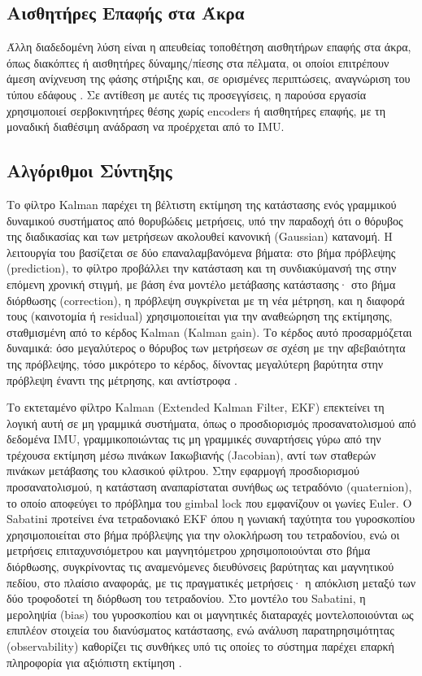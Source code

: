 \documentclass[11pt]{report}
\begin{document}
\subsection{Αισθητήρες Επαφής στα Άκρα}
Άλλη διαδεδομένη λύση είναι η απευθείας τοποθέτηση αισθητήρων επαφής στα
άκρα, όπως διακόπτες ή αισθητήρες δύναμης/πίεσης στα πέλματα, οι οποίοι
επιτρέπουν άμεση ανίχνευση της φάσης στήριξης και, σε ορισμένες περιπτώσεις,
αναγνώριση του τύπου εδάφους \cite{vangen_terrain_2023}. Σε αντίθεση με αυτές
τις προσεγγίσεις, η παρούσα εργασία χρησιμοποιεί σερβοκινητήρες θέσης χωρίς
encoders ή αισθητήρες επαφής, με τη μοναδική διαθέσιμη ανάδραση να προέρχεται
από το IMU.

\subsection{Αλγόριθμοι Σύντηξης}

Το φίλτρο Kalman παρέχει τη βέλτιστη εκτίμηση της κατάστασης ενός γραμμικού
δυναμικού συστήματος από θορυβώδεις μετρήσεις, υπό την παραδοχή ότι ο θόρυβος
της διαδικασίας και των μετρήσεων ακολουθεί κανονική (Gaussian) κατανομή. Η
λειτουργία του βασίζεται σε δύο επαναλαμβανόμενα βήματα: στο βήμα πρόβλεψης
(prediction), το φίλτρο προβάλλει την κατάσταση και τη συνδιακύμανσή της στην
επόμενη χρονική στιγμή, με βάση ένα μοντέλο μετάβασης κατάστασης· στο βήμα
διόρθωσης (correction), η πρόβλεψη συγκρίνεται με τη νέα μέτρηση, και η
διαφορά τους (καινοτομία ή residual) χρησιμοποιείται για την αναθεώρηση της
εκτίμησης, σταθμισμένη από το κέρδος Kalman (Kalman gain). Το κέρδος αυτό
προσαρμόζεται δυναμικά: όσο μεγαλύτερος ο θόρυβος των μετρήσεων σε σχέση με
την αβεβαιότητα της πρόβλεψης, τόσο μικρότερο το κέρδος, δίνοντας μεγαλύτερη
βαρύτητα στην πρόβλεψη έναντι της μέτρησης, και αντίστροφα \cite{kalman_new_1960}.

Το εκτεταμένο φίλτρο Kalman (Extended Kalman Filter, EKF) επεκτείνει τη
λογική αυτή σε μη γραμμικά συστήματα, όπως ο προσδιορισμός προσανατολισμού
από δεδομένα IMU, γραμμικοποιώντας τις μη γραμμικές συναρτήσεις γύρω από την
τρέχουσα εκτίμηση μέσω πινάκων Ιακωβιανής (Jacobian), αντί των σταθερών
πινάκων μετάβασης του κλασικού φίλτρου. Στην εφαρμογή προσδιορισμού
προσανατολισμού, η κατάσταση αναπαρίσταται συνήθως ως τετραδόνιο
(quaternion), το οποίο αποφεύγει το πρόβλημα του gimbal lock που εμφανίζουν
οι γωνίες Euler. Ο Sabatini προτείνει ένα τετραδονιακό EKF όπου η γωνιακή
ταχύτητα του γυροσκοπίου χρησιμοποιείται στο βήμα πρόβλεψης για την
ολοκλήρωση του τετραδονίου, ενώ οι μετρήσεις επιταχυνσιόμετρου και
μαγνητόμετρου χρησιμοποιούνται στο βήμα διόρθωσης, συγκρίνοντας τις
αναμενόμενες διευθύνσεις βαρύτητας και μαγνητικού πεδίου, στο πλαίσιο
αναφοράς, με τις πραγματικές μετρήσεις· η απόκλιση μεταξύ των δύο τροφοδοτεί
τη διόρθωση του τετραδονίου. Στο μοντέλο του Sabatini, η μεροληψία (bias) του
γυροσκοπίου και οι μαγνητικές διαταραχές μοντελοποιούνται ως επιπλέον
στοιχεία του διανύσματος κατάστασης, ενώ ανάλυση παρατηρησιμότητας
(observability) καθορίζει τις συνθήκες υπό τις οποίες το σύστημα παρέχει
επαρκή πληροφορία για αξιόπιστη εκτίμηση
\cite{sabatini_kalmanfilterbased_2011,garcia_ahrs}.
\end{document}
